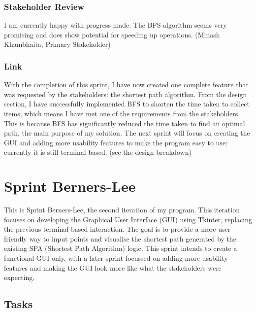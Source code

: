 \subsubsection{Stakeholder Review}

I am currently happy with progress made. The BFS algorithm seems very promising and does show potential for speeding up operations. (Minash Khambhaita, Primary Stakeholder)

\subsubsection{Link}

With the completion of this sprint, I have now created one complete feature that was requested by the stakeholders: the shortest path algorithm. From the design section, I have successfully implemented BFS to shorten the time taken to collect items, which means I have met one of the requirements from the stakeholders. This is because BFS has significantly reduced the time taken to find an optimal path, the main purpose of my solution. \newline The next sprint will focus on creating the GUI and adding more usability features to make the program easy to use: currently it is still terminal-based. (see the design breakdown)


\clearpage


\section{Sprint Berners-Lee}

This is Sprint Berners-Lee, the second iteration of my program. This iteration focuses on developing the Graphical User Interface (GUI) using Tkinter, replacing the previous terminal-based interaction. The goal is to provide a more user-friendly way to input points and visualise the shortest path generated by the existing SPA (Shortest Path Algorithm) logic. This sprint intends to create a functional GUI only, with a later sprint focussed on adding more usability features and making the GUI look more like what the stakeholders were expecting.

\subsection{Tasks}

